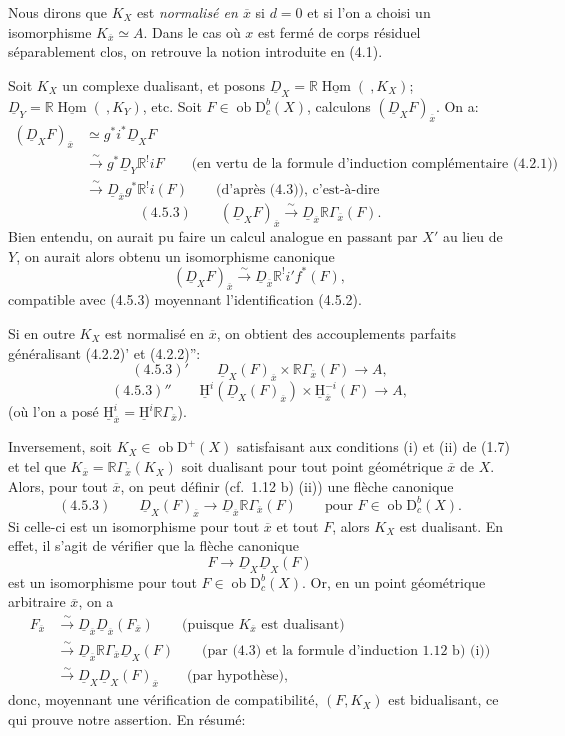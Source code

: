 \documentclass[11pt]{article}
\providecommand{\uH}{\underline{\mathrm H}}
\DeclareMathOperator{\Hom}{Hom}
\newcommand{\R}{\mathbb{R}}\newcommand{\RHomCore}{\mathbb{R}\mathrm{Hom}}
\newcommand{\D}{\mathrm{D}}
\newcommand{\ob}{\operatorname{ob}}
\newcommand{\ol}[1]{\overline{#1}}
\providecommand{\Hom}{\operatorname{Hom}}
\providecommand{\ob}{\operatorname{ob}}
\providecommand{\R}{\mathrm R}
\providecommand{\Hom}{\operatorname{Hom}}
\begin{document}
Nous dirons que $K_X$ est \emph{normalisé en $\ol{x}$} si $d=0$ et si l'on a choisi un isomorphisme $K_{\ol{x}}\simeq A$. Dans le cas où $x$ est fermé de corps résiduel séparablement clos, on retrouve la notion introduite en (4.1).

Soit $K_X$ un complexe dualisant, et posons $\underline{D}_X=\R\underline{\Hom}(\ ,K_X)$; $\underline{D}_Y=\R\underline{\Hom}(\ ,K_Y)$, etc. Soit $F\in\ob\D_c^b(X)$, calculons $(\underline{D}_XF)_{\ol{x}}$. On a:
\[
\begin{aligned}
(\underline{D}_XF)_{\ol{x}}&\simeq g^*i^*\underline{D}_X F\\
&\xrightarrow{\sim}g^*\underline{D}_Y\R^{!}iF\qquad\text{(en vertu de la formule d'induction complémentaire (4.2.1))}\\
&\xrightarrow{\sim}\underline{D}_{\ol{x}}g^*\R^{!}i(F)\qquad\text{(d'après (4.3)), c'est-à-dire}
\end{aligned}
\]
\[
(4.5.3)\qquad (\underline{D}_X F)_{\ol{x}}\xrightarrow{\sim}\underline{D}_{\ol{x}}\R\Gamma_{\ol{x}}(F).
\]
Bien entendu, on aurait pu faire un calcul analogue en passant par 
$X'$ au
lieu de $Y$, on aurait alors obtenu un isomorphisme canonique
\[
(\underline{D}_XF)_{\ol{x}}\xrightarrow{\sim}\underline{D}_{\ol{x}}\R^{!}i'f^*(F),
\]
compatible avec (4.5.3) moyennant l'identification (4.5.2).

Si en outre $K_X$ est normalisé en $\ol{x}$, on obtient des accouplements parfaits généralisant (4.2.2)' et (4.2.2)'':
\[
(4.5.3)'\qquad \underline{D}_X(F)_{\ol{x}}\times \R\Gamma_{\ol{x}}(F)\longrightarrow A,
\]
\[
(4.5.3)''\qquad \uH^i(\underline{D}_X(F)_{\ol{x}})\times \uH_{\ol{x}}^{-i}(F)\longrightarrow A,
\]
(où l'on a posé $\uH_{\ol{x}}^i=\uH^i\R\Gamma_{\ol{x}}$).

Inversement, soit $K_X\in\ob\D^+(X)$ satisfaisant aux conditions (i) et (ii) de (1.7) et tel que $K_{\ol{x}}=\R\Gamma_{\ol{x}}(K_X)$ soit dualisant pour tout point géométrique $\ol{x}$ de $X$. Alors, pour tout $\ol{x}$, on peut définir (cf.~1.12 b) (ii)) une flèche canonique
\[
(4.5.3)\qquad \underline{D}_X(F)_{\ol{x}}\longrightarrow \underline{D}_{\ol{x}}\R\Gamma_{\ol{x}}(F)\qquad \text{pour } F\in\ob\D_c^b(X).
\]
Si celle-ci est un isomorphisme pour tout $\ol{x}$ et tout $F$, alors $K_X$ est dualisant. En effet, il s'agit de vérifier que la flèche canonique
\[
F\longrightarrow \underline{D}_X\underline{D}_X(F)
\]
est un isomorphisme pour tout $F\in\ob\D_c^b(X)$. Or, en un point géométrique arbitraire $\ol{x}$, on a
\[
\begin{aligned}
F_{\ol{x}}&\xrightarrow{\sim}\underline{D}_{\ol{x}}\underline{D}_{\ol{x}}(F_{\ol{x}})\qquad\text{(puisque $K_{\ol{x}}$ est dualisant)}\\
&\xrightarrow{\sim}\underline{D}_{\ol{x}}\R\Gamma_{\ol{x}}\underline{D}_X(F)\qquad\text{(par (4.3) et la formule d'induction 1.12 b) (i))}\\
&\xrightarrow{\sim}\underline{D}_X\underline{D}_X(F)_{\ol{x}}\qquad\text{(par hypothèse)},
\end{aligned}
\]
donc, moyennant une vérification de compatibilité, $(F,K_X)$ est bidualisant, ce qui prouve notre assertion. En résumé:
\end{document}
